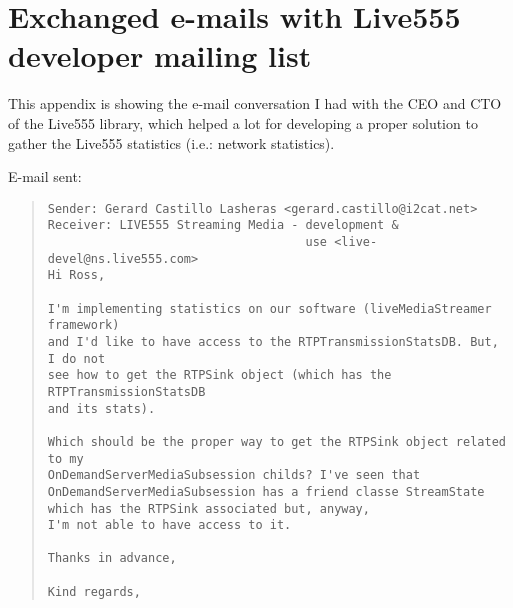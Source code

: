 \chapter{Exchanged e-mails with Live555 developer mailing list}\label{ANX:emailRoss}

This appendix is showing the e-mail conversation I had with the CEO and CTO of the Live555 library, which helped a lot for developing a proper solution to gather the Live555 statistics (i.e.: network statistics).

E-mail sent:

\begin{quote}
\begin{verbatim}
Sender: Gerard Castillo Lasheras <gerard.castillo@i2cat.net>
Receiver: LIVE555 Streaming Media - development & 
									use <live-devel@ns.live555.com> 
Hi Ross,

I'm implementing statistics on our software (liveMediaStreamer framework) 
and I'd like to have access to the RTPTransmissionStatsDB. But, I do not
see how to get the RTPSink object (which has the RTPTransmissionStatsDB 
and its stats).

Which should be the proper way to get the RTPSink object related to my
OnDemandServerMediaSubsession childs? I've seen that 
OnDemandServerMediaSubsession has a friend classe StreamState 
which has the RTPSink associated but, anyway, 
I'm not able to have access to it.

Thanks in advance,

Kind regards,
\end{verbatim}
\end{quote} 

